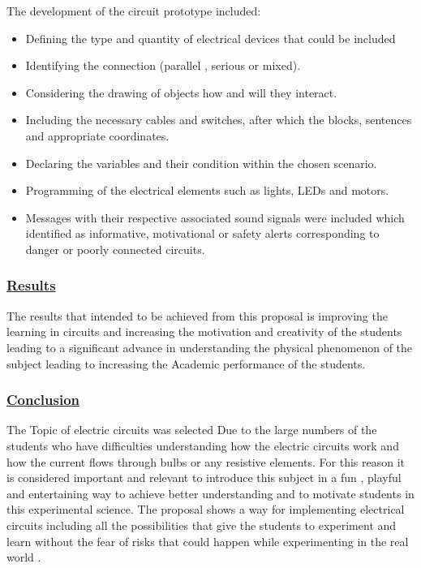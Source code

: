 \documentclass[../main.tex]{subfiles}
\begin{document}
The development of the circuit prototype included:
\begin{itemize}
    \item Defining the type and quantity of electrical devices that could be included
    \item Identifying  the connection  (parallel , serious or mixed).
    \item Considering the drawing of objects 
     how and will they interact.
     \item Including the necessary cables and switches, after which the blocks, sentences and appropriate coordinates.
     \item Declaring the variables and their condition within the chosen scenario.
     \item Programming of the electrical elements such as lights, LEDs and motors.
     \item Messages with their respective associated sound signals were included which identified as informative, motivational or safety alerts corresponding to danger or poorly connected circuits.
\end{itemize}

 \subsubsection*{\underline{Results}}

 The results that intended to be achieved from this proposal is improving the learning in circuits and increasing the motivation and creativity of the students leading to a signiﬁcant advance in understanding the physical phenomenon of the subject leading to increasing the Academic performance of the students.

\subsubsection*{\underline{Conclusion}}

The Topic of electric circuits was selected Due to the large numbers of the students who have difficulties understanding how the electric circuits work and how the current flows through bulbs or any resistive elements. For this reason it is considered important and relevant to introduce this subject  in a fun , playful and entertaining way to achieve better understanding and to motivate students in this experimental science. The proposal shows a way for implementing electrical circuits including all the possibilities that give the students  to experiment and learn without the fear of risks that could happen while experimenting in the real world \cite{27}.
\newpage
\end{document}

